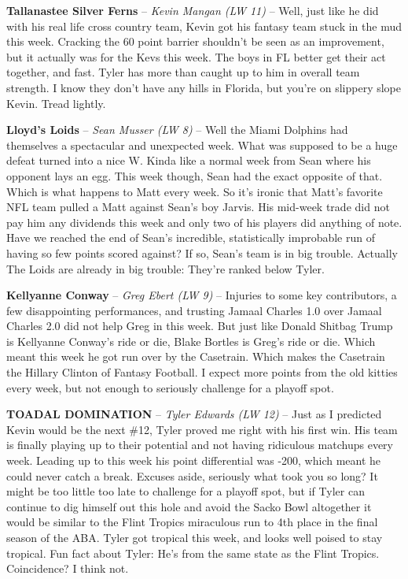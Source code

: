 \documentclass[11pt,letterpaper]{article}
\begin{document}
\newpage
{}
\begin{etaremune}
\item \textbf{Tallanastee Silver Ferns} -- \textit{Kevin Mangan (LW 11)} -- Well, just like he did with his real life cross country team, Kevin got his fantasy team stuck in the mud this week. Cracking the 60 point barrier shouldn't be seen as an improvement, but it actually was for the Kevs this week. The boys in FL better get their act together, and fast. Tyler has more than caught up to him in overall team strength. I know they don't have any hills in Florida, but you're on slippery slope Kevin. Tread lightly. 
\item \textbf{Lloyd's Loids} -- \textit{Sean Musser (LW 8)} -- Well the Miami Dolphins had themselves a spectacular and unexpected week. What was supposed to be a huge defeat turned into a nice W. Kinda like a normal week from Sean where his opponent lays an egg. This week though, Sean had the exact opposite of that. Which is what happens to Matt every week. So it's ironic that Matt's favorite NFL team pulled a Matt against Sean's boy Jarvis. His mid-week trade did not pay him any dividends this week and only two of his players did anything of note. Have we reached the end of Sean's incredible, statistically improbable run of having so few points scored against? If so, Sean's team is in big trouble. Actually The Loids are already in big trouble: They're ranked below Tyler. 
\item \textbf{Kellyanne Conway} -- \textit{Greg Ebert (LW 9)} -- Injuries to some key contributors, a few disappointing performances, and trusting Jamaal Charles 1.0 over Jamaal Charles 2.0 did not help Greg in this week. But just like Donald Shitbag Trump is Kellyanne Conway's ride or die, Blake Bortles is Greg's ride or die. Which meant this week he got run over by the Casetrain. Which makes the Casetrain the Hillary Clinton of Fantasy Football. I expect more points from the old kitties every week, but not enough to seriously challenge for a playoff spot. 
\item \textbf{TOADAL DOMINATION} -- \textit{Tyler Edwards (LW 12)} -- Just as I predicted Kevin would be the next \#12, Tyler proved me right with his first win. His team is finally playing up to their potential and not having ridiculous matchups every week. Leading up to this week his point differential was -200, which meant he could never catch a break. Excuses aside, seriously what took you so long? It might be too little too late to challenge for a playoff spot, but if Tyler can continue to dig himself out this hole and avoid the Sacko Bowl altogether it would be similar to the Flint Tropics miraculous run to 4th place in the final season of the ABA. Tyler got tropical this week, and looks well poised to stay tropical. Fun fact about Tyler: He's from the same state as the Flint Tropics. Coincidence? I think not. 

\end{etaremune}
\end{document}
